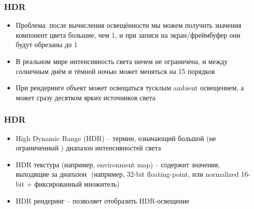 \documentclass[10pt]{beamer}
\begin{document}
\begin{frame}[fragile]
\frametitle{HDR}
\begin{itemize}
\item Проблема: после вычисления освещённости мы можем получить значения компонент цвета большие, чем 1, и при записи на экран/фреймбуфер они будут обрезаны до 1
\pause
\item В реальном мире интенсивность света ничем не ограничена, и между солнечным днём и тёмной ночью может меняться на 15 порядков
\pause
\item При рендеринге объект может освещаться тусклым ambient освещением, а может сразу десятком ярких источников света
\end{itemize}
\end{frame}

\begin{frame}[fragile]
\frametitle{HDR}
\begin{itemize}
\item High Dynamic Range (HDR) -- термин, означающий большой (не ограниченный \begin{math}[0, 1]\end{math}) диапазон интенсивностей света
\pause
\item HDR текстура (например, environment map) -- содержит значения, выходящие за диапазон \begin{math}[0, 1]\end{math} (например, 32-bit floating-point, или normalized 16-bit + фиксированный множитель)
\pause
\item HDR рендеринг -- позволяет отобразить HDR-освещение
\end{itemize}
\end{frame}
\end{document}
